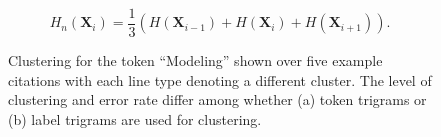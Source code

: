 {\begin{equation}
H_{n}(\mathbf{X}_{i}) = \frac{1}{3}\left(H(\mathbf{X}_{i-1}) + H(\mathbf{X}_{i}) + H(\mathbf{X}_{i+1})\right).
\end{equation}

}

\begin{figure}[t]
		\centering
		\caption{Clustering for the token ``Modeling'' shown over five example citations with each line type denoting a different cluster.  The level of clustering and error rate differ among whether (a) token trigrams or (b) label trigrams are used for clustering.} 
		\label{fig:cluster}
\end{figure}

